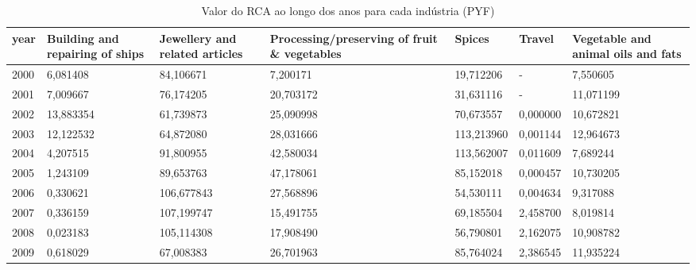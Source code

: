 \begin{table}
\centering
\caption{Valor do RCA ao longo dos anos para cada indústria (PYF)}
\begin{tabular}{p{1cm}p{2cm}p{2cm}p{2cm}p{2cm}p{2cm}p{2cm}}
\toprule
 year &  Building and repairing of ships &  Jewellery and related articles &  Processing/preserving of fruit \& vegetables &     Spices &   Travel &  Vegetable and animal oils and fats \\
\midrule
 2000 &                         6,081408 &                       84,106671 &                                     7,200171 &  19,712206 &        - &                            7,550605 \\
 2001 &                         7,009667 &                       76,174205 &                                    20,703172 &  31,631116 &        - &                           11,071199 \\
 2002 &                        13,883354 &                       61,739873 &                                    25,090998 &  70,673557 & 0,000000 &                           10,672821 \\
 2003 &                        12,122532 &                       64,872080 &                                    28,031666 & 113,213960 & 0,001144 &                           12,964673 \\
 2004 &                         4,207515 &                       91,800955 &                                    42,580034 & 113,562007 & 0,011609 &                            7,689244 \\
 2005 &                         1,243109 &                       89,653763 &                                    47,178061 &  85,152018 & 0,000457 &                           10,730205 \\
 2006 &                         0,330621 &                      106,677843 &                                    27,568896 &  54,530111 & 0,004634 &                            9,317088 \\
 2007 &                         0,336159 &                      107,199747 &                                    15,491755 &  69,185504 & 2,458700 &                            8,019814 \\
 2008 &                         0,023183 &                      105,114308 &                                    17,908490 &  56,790801 & 2,162075 &                           10,908782 \\
 2009 &                         0,618029 &                       67,008383 &                                    26,701963 &  85,764024 & 2,386545 &                           11,935224 \\

\end{tabular}
\end{table}
